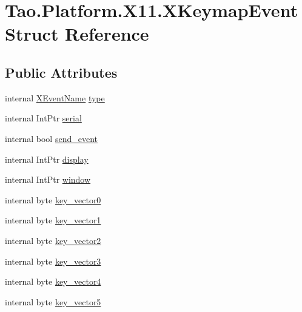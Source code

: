 \hypertarget{struct_tao_1_1_platform_1_1_x11_1_1_x_keymap_event}{
\section{Tao.Platform.X11.XKeymapEvent Struct Reference}
\label{struct_tao_1_1_platform_1_1_x11_1_1_x_keymap_event}
}
\subsection*{Public Attributes}
\begin{DoxyCompactItemize}
\item 
internal \hyperlink{namespace_tao_1_1_platform_1_1_x11_aff81ed5b8778e1ea8e872861dff9f146}{XEventName} \hyperlink{struct_tao_1_1_platform_1_1_x11_1_1_x_keymap_event_aea848f6774856c843b11a251a97265b5}{type}
\item 
internal IntPtr \hyperlink{struct_tao_1_1_platform_1_1_x11_1_1_x_keymap_event_a8565ee5a093871ab6fe21b7a7e15ac7e}{serial}
\item 
internal bool \hyperlink{struct_tao_1_1_platform_1_1_x11_1_1_x_keymap_event_a614ce32ea9a01b926af30ebca25f87da}{send\_\-event}
\item 
internal IntPtr \hyperlink{struct_tao_1_1_platform_1_1_x11_1_1_x_keymap_event_ab9050a37131bac2be68a6d60d2d5ca31}{display}
\item 
internal IntPtr \hyperlink{struct_tao_1_1_platform_1_1_x11_1_1_x_keymap_event_a891a61e347fba5f8f80a00b9a5aad858}{window}
\item 
internal byte \hyperlink{struct_tao_1_1_platform_1_1_x11_1_1_x_keymap_event_a9932c53b34b75556b532ecfb9b2ded3d}{key\_\-vector0}
\item 
internal byte \hyperlink{struct_tao_1_1_platform_1_1_x11_1_1_x_keymap_event_a4998914d5593a96047d6132c4041be70}{key\_\-vector1}
\item 
internal byte \hyperlink{struct_tao_1_1_platform_1_1_x11_1_1_x_keymap_event_a1b713fa53a5398a34c2631b9d7025433}{key\_\-vector2}
\item 
internal byte \hyperlink{struct_tao_1_1_platform_1_1_x11_1_1_x_keymap_event_a1de88df7aa4c25f791239bc3c426f9be}{key\_\-vector3}
\item 
internal byte \hyperlink{struct_tao_1_1_platform_1_1_x11_1_1_x_keymap_event_a6e4786d56298b0dc2f1f7b0531dd6161}{key\_\-vector4}
\item 
internal byte \hyperlink{struct_tao_1_1_platform_1_1_x11_1_1_x_keymap_event_ae3437820c64a161973b60edf2d0257fa}{key\_\-vector5}

\end{DoxyCompactItemize}
